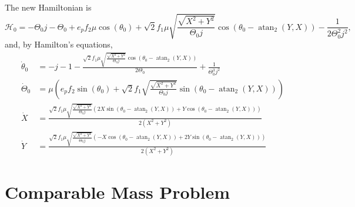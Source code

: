 \documentclass[usenatbib,twocolumn]{mnras}
\begin{document}
The new Hamiltonian is
\begin{equation}
    \mathcal H_0 = - \Theta_{0} j - \Theta_{0} + e_{p} f_{2} \mu \cos{\left(\theta_{0} \right)} + \sqrt{2} f_{1} \mu \sqrt{\frac{\sqrt{X^{2} + Y^{2}}}{\Theta_{0} j}} \cos{\left(\theta_{0} - \operatorname{atan}_{2}{\left(Y,X \right)} \right)} - \frac{1}{2 \Theta_{0}^{2} j^{2}},
\end{equation}
and, by Hamilton's equations,
\begin{align}
   \dot\theta_0 &= - j - 1 - \frac{\sqrt{2} f_{1} \mu \sqrt{\frac{\sqrt{X^{2} + Y^{2}}}{\Theta_{0} j}} \cos{\left(\theta_{0} - \operatorname{atan}_{2}{\left(Y,X \right)} \right)}}{2 \Theta_{0}} + \frac{1}{\Theta_{0}^{3} j^{2}}\\
   \dot\Theta_0 &= \mu \left(e_{p} f_{2} \sin{\left(\theta_{0} \right)} + \sqrt{2} f_{1} \sqrt{\frac{\sqrt{X^{2} + Y^{2}}}{\Theta_{0} j}} \sin{\left(\theta_{0} - \operatorname{atan}_{2}{\left(Y,X \right)} \right)}\right)\\
   \dot X &= \frac{\sqrt{2} f_{1} \mu \sqrt{\frac{\sqrt{X^{2} + Y^{2}}}{\Theta_{0} j}} \left(2 X \sin{\left(\theta_{0} - \operatorname{atan}_{2}{\left(Y,X \right)} \right)} + Y \cos{\left(\theta_{0} - \operatorname{atan}_{2}{\left(Y,X \right)} \right)}\right)}{2 \left(X^{2} + Y^{2}\right)} \\
   \dot Y &= \frac{\sqrt{2} f_{1} \mu \sqrt{\frac{\sqrt{X^{2} + Y^{2}}}{\Theta_{0} j}} \left(- X \cos{\left(\theta_{0} - \operatorname{atan}_{2}{\left(Y,X \right)} \right)} + 2 Y \sin{\left(\theta_{0} - \operatorname{atan}_{2}{\left(Y,X \right)} \right)}\right)}{2 \left(X^{2} + Y^{2}\right)}
\end{align}

\section{Comparable Mass Problem}
\end{document}
